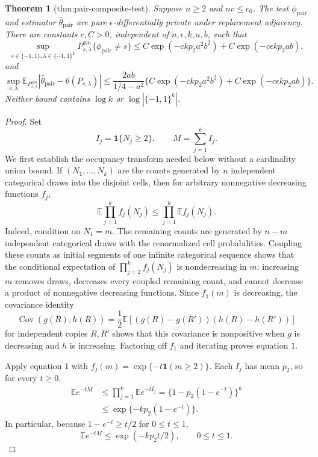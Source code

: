 \documentclass{article}
\newtheorem{theorem}{Theorem}
\begin{document}
\begin{theorem}[thm:pair-composite-test]\label{thm:pair-composite-test}
Suppose \(n\ge2\) and \(nv\le c_0\). The test \(\phi_{\mathrm{pair}}\) and estimator \(\widehat\theta_{\mathrm{pair}}\) are pure \(\epsilon\)-differentially private under replacement adjacency. There are constants \(c,C>0\), independent of \(n,\epsilon,k,a,b\), such that \[\sup_{s\in\{-1,1\},\lambda\in\{-1,1\}^k}P_{s,\lambda}^{\otimes n}\{\phi_{\mathrm{pair}}\ne s\}\le C\exp(-ckp_2a^2b^2)+C\exp(-c\epsilon kp_2ab),\] and \[\sup_{s,\lambda}\mathbb E_{P_{s,\lambda}^{\otimes n}}|\widehat\theta_{\mathrm{pair}}-\theta(P_{s,\lambda})|\le\frac{2ab}{1/4-a^2}\{C\exp(-ckp_2a^2b^2)+C\exp(-c\epsilon kp_2ab)\}.\] Neither bound contains \(\log k\) or \(\log|\{-1,1\}^k|\).
\end{theorem}
\begin{proof}
Set
\[
 I_j=\mathbf 1\{N_j\ge2\},
 \qquad
 M=\sum_{j=1}^k I_j.
\]
We first establish the occupancy transform needed below without a cardinality union bound.  If \((N_1,\ldots,N_k)\) are the counts generated by \(n\) independent categorical draws into the disjoint cells, then for arbitrary nonnegative decreasing functions \(f_j\),
\[
 \mathbb E\prod_{j=1}^k f_j(N_j)
 \le\prod_{j=1}^k\mathbb E f_j(N_j). \tag{1}
\]
Indeed, condition on \(N_1=m\).  The remaining counts are generated by \(n-m\) independent categorical draws with the renormalized cell probabilities.  Coupling these counts as initial segments of one infinite categorical sequence shows that the conditional expectation of \(\prod_{j=2}^k f_j(N_j)\) is nondecreasing in \(m\): increasing \(m\) removes draws, decreases every coupled remaining count, and cannot decrease a product of nonnegative decreasing functions.  Since \(f_1(m)\) is decreasing, the covariance identity
\[
 \operatorname{Cov}(g(R),h(R))
 =\frac12\mathbb E[(g(R)-g(R'))(h(R)-h(R'))]
\]
for independent copies \(R,R'\) shows that this covariance is nonpositive when \(g\) is decreasing and \(h\) is increasing.  Factoring off \(f_1\) and iterating proves equation \(1\).

Apply equation \(1\) with \(f_j(m)=\exp\{-t\mathbf 1(m\ge2)\}\).  Each \(I_j\) has mean \(p_2\), so for every \(t\ge0\),
\[
 \begin{aligned}
 \mathbb E e^{-tM}
 &\le\prod_{j=1}^k\mathbb E e^{-tI_j}
 =\{1-p_2(1-e^{-t})\}^k\\
 &\le\exp\{-kp_2(1-e^{-t})\}. \tag{2}
 \end{aligned}
\]
In particular, because \(1-e^{-t}\ge t/2\) for \(0\le t\le1\),
\[
 \mathbb E e^{-tM}\le\exp(-kp_2t/2),
 \qquad 0\le t\le1. \tag{3}
\]


\end{proof}
\end{document}
